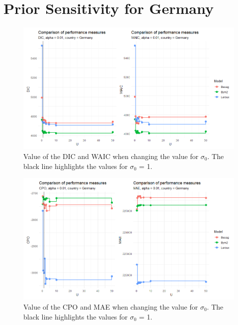 \section{Prior Sensitivity for Germany}
\begin{figure}[H]
    \centering
    \includegraphics[width = \textwidth]{comparison_1_germany.png}
    \caption{Value of the DIC and WAIC when changing the value for $\sigma_0$. The black line highlights the values for $\sigma_0$ = 1.}
    \label{comparison_germany_1}
\end{figure}
%     
\begin{figure}[H]
    \centering
    \includegraphics[width = \textwidth]{comparison_2_germany.png}
    \caption{Value of the CPO and MAE when changing the value for $\sigma_0$. The black line highlights the values for $\sigma_0$ = 1.}
    \label{comparison_germany_2}
\end{figure}
